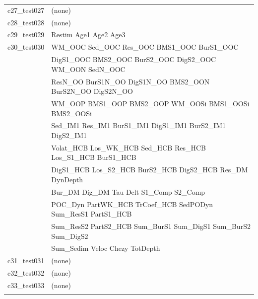 \begin{longtable}{ll}
c27\_test027 & (none) \\
c28\_test028 & (none) \\
c29\_test029 & Restim Age1 Age2 Age3 \\
c30\_test030 & WM\_OOC Sed\_OOC Res\_OOC BMS1\_OOC BurS1\_OOC \\ 
 & DigS1\_OOC BMS2\_OOC BurS2\_OOC DigS2\_OOC WM\_OON SedN\_OOC \\ 
 & ResN\_OO BurS1N\_OO DigS1N\_OO BMS2\_OON BurS2N\_OO DigS2N\_OO \\ 
 & WM\_OOP BMS1\_OOP BMS2\_OOP WM\_OOSi BMS1\_OOSi BMS2\_OOSi \\ 
 & Sed\_IM1 Res\_IM1 BurS1\_IM1 DigS1\_IM1 BurS2\_IM1 DigS2\_IM1 \\ 
 & Volat\_HCB Los\_WK\_HCB Sed\_HCB Res\_HCB Los\_S1\_HCB BurS1\_HCB \\ 
 & DigS1\_HCB Los\_S2\_HCB BurS2\_HCB DigS2\_HCB Res\_DM DynDepth \\ 
 & Bur\_DM Dig\_DM Tau Delt S1\_Comp S2\_Comp \\ 
 & POC\_Dyn PartWK\_HCB TrCoef\_HCB SedPODyn Sum\_ResS1 PartS1\_HCB \\ 
 & Sum\_ResS2 PartS2\_HCB Sum\_BurS1 Sum\_DigS1 Sum\_BurS2 Sum\_DigS2 \\ 
 & Sum\_Sedim Veloc Chezy TotDepth \\
c31\_test031 & (none) \\
c32\_test032 & (none) \\
c33\_test033 & (none) \\

\hline \\
\end{longtable}
